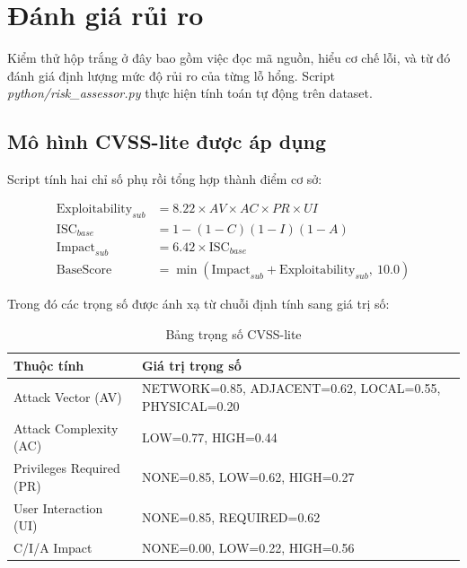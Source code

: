 
\section{Đánh giá rủi ro}
\label{sec:hoptrang}

Kiểm thử hộp trắng ở đây bao gồm việc đọc mã nguồn, hiểu cơ chế lỗi, và từ đó
đánh giá định lượng mức độ rủi ro của từng lỗ hổng. Script
\textit{python/risk\_assessor.py} thực hiện tính toán tự động trên dataset.

\subsection{Mô hình CVSS-lite được áp dụng}

Script tính hai chỉ số phụ rồi tổng hợp thành điểm cơ sở:

\begin{align}
    \mathrm{Exploitability}_{sub} &= 8.22 \times AV \times AC \times PR \times UI \\
    \mathrm{ISC}_{base} &= 1 - (1-C)(1-I)(1-A) \\
    \mathrm{Impact}_{sub} &= 6.42 \times \mathrm{ISC}_{base} \\
    \mathrm{BaseScore} &= \min(\mathrm{Impact}_{sub} + \mathrm{Exploitability}_{sub},\ 10.0)
\end{align}

Trong đó các trọng số được ánh xạ từ chuỗi định tính sang giá trị số:

\begin{table}[H]
\centering
\begin{tabularx}{\textwidth}{|p{3.5cm}|X|}
\hline
\textbf{Thuộc tính} & \textbf{Giá trị trọng số} \\ \hline
Attack Vector (AV)  & NETWORK=0.85, ADJACENT=0.62, LOCAL=0.55, PHYSICAL=0.20 \\ \hline
Attack Complexity (AC) & LOW=0.77, HIGH=0.44 \\ \hline
Privileges Required (PR) & NONE=0.85, LOW=0.62, HIGH=0.27 \\ \hline
User Interaction (UI) & NONE=0.85, REQUIRED=0.62 \\ \hline
C/I/A Impact & NONE=0.00, LOW=0.22, HIGH=0.56 \\ \hline
\end{tabularx}
\caption{Bảng trọng số CVSS-lite}
\end{table}

